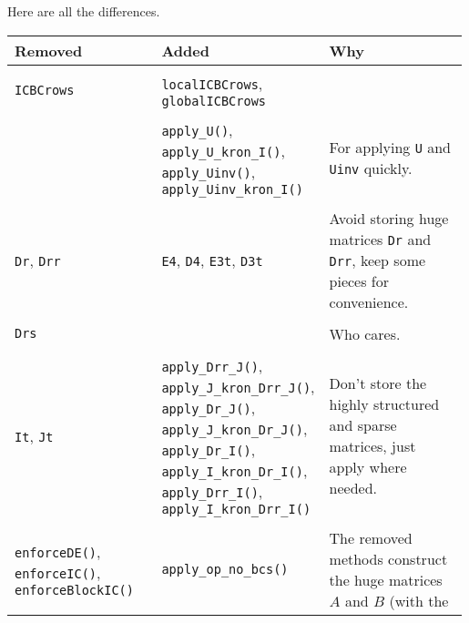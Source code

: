 Here are all the differences.
\begin{center}
\begin{longtable}{p{0.33\linewidth} p{0.33\linewidth} p{0.33\linewidth}}
{\bf Removed}          & {\bf Added}             & {\bf Why} \\ 
\hline \\ 
{\tt ICBCrows}         & {\tt localICBCrows}, 
                         {\tt globalICBCrows}    & \\ \hline \\
                       & {\tt apply\_U()}, 
                         {\tt apply\_U\_kron\_I()},
                         {\tt apply\_Uinv()},
                         {\tt apply\_Uinv\_kron\_I()} 
                       & For applying {\tt U} and {\tt Uinv}
                         quickly. \\ \hline \\ 
{\tt Dr},
{\tt Drr}              & {\tt E4}, {\tt D4},
                         {\tt E3t}, {\tt D3t}
                       & Avoid storing huge matrices
                         {\tt Dr} and {\tt Drr}, keep
                         some pieces for convenience. \\ \hline \\ 
{\tt Drs}              &                         
                       & Who cares. \\ \hline \\ 
{\tt It},
{\tt Jt}               & {\tt apply\_Drr\_J()},
                         {\tt apply\_J\_kron\_Drr\_J()},
                         {\tt apply\_Dr\_J()},
                         {\tt apply\_J\_kron\_Dr\_J()},
                         {\tt apply\_Dr\_I()},
                         {\tt apply\_I\_kron\_Dr\_I()},
                         {\tt apply\_Drr\_I()},
                         {\tt apply\_I\_kron\_Drr\_I()} 
                       & Don't store the highly structured
                         and sparse matrices, just apply where needed. \\ \hline \\ 
{\tt enforceDE()},
{\tt enforceIC()},
{\tt enforceBlockIC()} & {\tt apply\_op\_no\_bcs()} 
                       & The removed methods construct the
                         huge matrices $A$ and $B$ (with the

\end{longtable}
\end{center}

